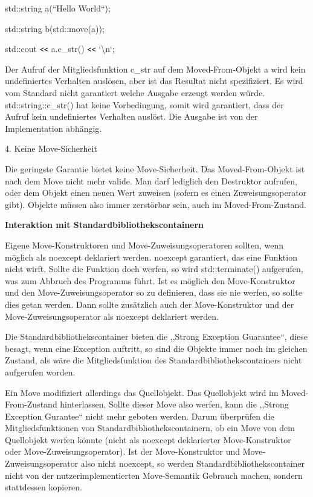 \documentclass{article}
\begin{document}
\vspace{12pt}
std::string a(``Hello World``);

std::string b(std::move(a));

std::cout \texttt{<}\texttt{<} a.c\_str() \texttt{<}\texttt{<} `\textbackslash{}n`;

\vspace{12pt}
Der Aufruf der Mitgliedsfunktion c\_str auf dem Moved-From-Objekt a wird kein undefiniertes 
Verhalten auslösen, aber ist das Resultat nicht spezifiziert. Es wird vom Standard 
nicht garantiert welche Ausgabe erzeugt werden würde. std::string::c\_str() hat 
keine Vorbedingung, somit wird garantiert, dass der Aufruf kein undefiniertes Verhalten 
auslöst. Die Ausgabe ist von der Implementation abhängig.

\vspace{12pt}
4. Keine Move-Sicherheit

Die geringste Garantie bietet keine Move-Sicherheit. Das Moved-From-Objekt ist 
nach dem Move nicht mehr valide. Man darf lediglich den Destruktor aufrufen, oder 
dem Objekt einen neuen Wert zuweisen (sofern es einen Zuweisungsoperator gibt). 
Objekte müssen also immer zerstörbar sein, auch im Moved-From-Zustand. 

\vspace{25pt}
\textbf{Interaktion mit Standardbibliothekscontainern}

Eigene Move-Konstruktoren und Move-Zuweisungsoperatoren sollten, wenn möglich 
als noexcept deklariert werden. noexcept garantiert, das eine Funktion nicht wirft. 
Sollte die Funktion doch werfen, so wird std::terminate() aufgerufen, was zum Abbruch 
des Programms führt. Ist es möglich den Move-Konstruktor und den Move-Zuweisungsoperator 
so zu definieren, dass sie nie werfen, so sollte dies getan werden. Dann sollte 
zusätzlich auch der Move-Konstruktor und der Move-Zuweisungsoperator als noexcept 
deklariert werden.

Die Standardbibliothekscontainer bieten die ,,Strong Exception Guarantee``, diese 
besagt, wenn eine Exception auftritt, so sind die Objekte immer noch im gleichen 
Zustand, als wäre die Mitgliedsfunktion des Standardbibliothekscontainers nicht 
aufgerufen worden.

Ein Move modifiziert allerdings das Quellobjekt. Das Quellobjekt wird im Moved-From-Zustand 
hinterlassen. Sollte dieser Move also werfen, kann die ,,Strong Exception Gurantee`` 
nicht mehr geboten werden. Darum überprüfen die Mitgliedsfunktionen von Standardbibliothekscontainern, 
ob ein Move von dem Quellobjekt werfen könnte (nicht als noexcept deklarierter 
Move-Konstruktor oder Move-Zuweisungsoperator). Ist der Move-Konstruktor und Move-Zuweisungsoperator 
also nicht noexcept, so werden Standardbibliothekscontainer nicht von der nutzerimplementierten 
Move-Semantik Gebrauch machen, sondern stattdessen kopieren.
\end{document}
